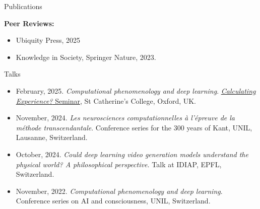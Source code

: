\documentclass[]{mcdowellcv}
\begin{document}
\begin{cvsection}{Publications}
\begin{cvsubsection}{}{}{}
        \vspace{0.1cm}
        \textbf{Peer Reviews:} \vspace{0.1cm}
        \begin{itemize}
            \item Ubiquity Press, 2025
            \item Knowledge in Society, Springer Nature, 2023.
        \end{itemize}

    \end{cvsubsection}
\end{cvsection}



 \begin{cvsection}{Talks}

\begin{cvsubsection}{}{}{}
\begin{itemize}
\setlength\itemsep{0.4em}

\item February, 2025. \textit{Computational phenomenology and deep learning}. \href{https://ideas-ncbr.pl/en/events/calculating-experience-phenomenology-ai-for-mental-health-seminar/}{\textit{Calculating Experience?} Seminar}, St Catherine's College, Oxford, UK.

\item November, 2024. \textit{Les neurosciences computationnelles à l'épreuve de la méthode transcendantale}. Conference series for the 300 years of Kant, UNIL, Lausanne, Switzerland.

\item October, 2024. \textit{Could deep learning video generation models understand the physical world? A philosophical perspective.} Talk at IDIAP, EPFL, Switzerland.

\item November, 2022. \textit{Computational phenomenology and deep learning}. Conference series on AI and consciousness, UNIL, Switzerland.

\end{itemize}
\end{cvsubsection}

 
 \end{cvsection}
\end{document}
